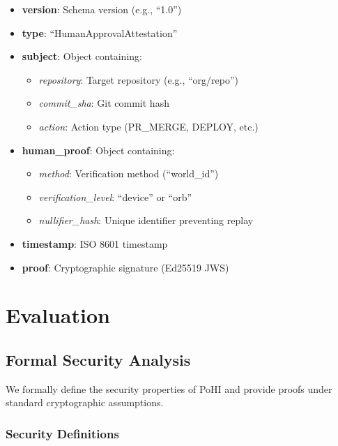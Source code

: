 \documentclass[conference]{IEEEtran}
\begin{document}
\begin{itemize}
    \item \textbf{version}: Schema version (e.g., ``1.0'')
    \item \textbf{type}: ``HumanApprovalAttestation''
    \item \textbf{subject}: Object containing:
    \begin{itemize}
        \item \textit{repository}: Target repository (e.g., ``org/repo'')
        \item \textit{commit\_sha}: Git commit hash
        \item \textit{action}: Action type (PR\_MERGE, DEPLOY, etc.)
    \end{itemize}
    \item \textbf{human\_proof}: Object containing:
    \begin{itemize}
        \item \textit{method}: Verification method (``world\_id'')
        \item \textit{verification\_level}: ``device'' or ``orb''
        \item \textit{nullifier\_hash}: Unique identifier preventing replay
    \end{itemize}
    \item \textbf{timestamp}: ISO 8601 timestamp
    \item \textbf{proof}: Cryptographic signature (Ed25519 JWS)
\end{itemize}

\section{Evaluation}

\subsection{Formal Security Analysis}

We formally define the security properties of PoHI and provide proofs under standard cryptographic assumptions.

\subsubsection{Security Definitions}
\end{document}
